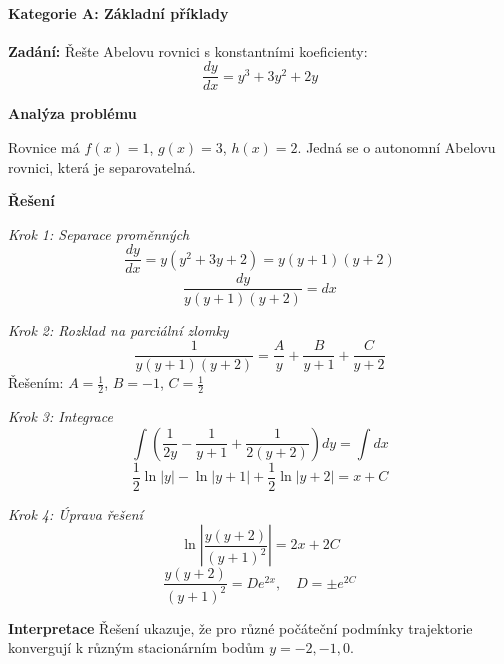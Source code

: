 \paragraph*{Kategorie A: Základní příklady}

\begin{example}
\label{ex:abel-konstantni}

\noindent\textbf{Zadání:} Řešte Abelovu rovnici s konstantními koeficienty:
\[
\frac{dy}{dx} = y^3 + 3y^2 + 2y
\]

\vspace{1.5\baselineskip}

\noindent\textbf{Analýza problému}

Rovnice má $f(x) = 1$, $g(x) = 3$, $h(x) = 2$. Jedná se o autonomní Abelovu rovnici, která je separovatelná.

\vspace{1.5\baselineskip}

\noindent\textbf{Řešení}

\noindent\textit{Krok 1: Separace proměnných}
\[
\frac{dy}{dx} = y(y^2 + 3y + 2) = y(y+1)(y+2)
\]
\[
\frac{dy}{y(y+1)(y+2)} = dx
\]

\vspace{1\baselineskip}

\noindent\textit{Krok 2: Rozklad na parciální zlomky}
\[
\frac{1}{y(y+1)(y+2)} = \frac{A}{y} + \frac{B}{y+1} + \frac{C}{y+2}
\]
Řešením: $A = \frac{1}{2}$, $B = -1$, $C = \frac{1}{2}$

\vspace{1\baselineskip}

\noindent\textit{Krok 3: Integrace}
\[
\int \left(\frac{1}{2y} - \frac{1}{y+1} + \frac{1}{2(y+2)}\right) dy = \int dx
\]
\[
\frac{1}{2}\ln|y| - \ln|y+1| + \frac{1}{2}\ln|y+2| = x + C
\]

\vspace{1\baselineskip}

\noindent\textit{Krok 4: Úprava řešení}
\[
\ln\left|\frac{y(y+2)}{(y+1)^2}\right| = 2x + 2C
\]
\[
\frac{y(y+2)}{(y+1)^2} = De^{2x}, \quad D = \pm e^{2C}
\]

\vspace{1.5\baselineskip}

\noindent\textbf{Interpretace}
Řešení ukazuje, že pro různé počáteční podmínky trajektorie konvergují k různým stacionárním bodům $y = -2, -1, 0$.

\end{example}

